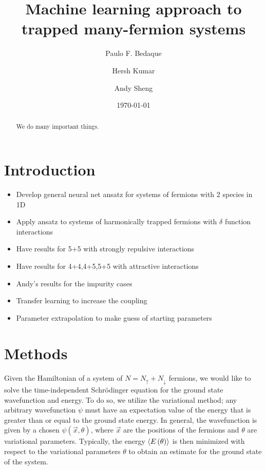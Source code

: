 \documentclass
[amsmath,10pt,aps,preprintnumbers,onecolumn,groupedaddress,superscriptaddress,notitlepage,nofootinbib,prd]{revtex4-1}
\begin{document}
\title{Machine learning approach to trapped many-fermion systems}


\author{Paulo F. Bedaque}
\author{Hersh Kumar}
\author{Andy Sheng}

\date{\today}

\begin{abstract}
We do many important things.

\end{abstract}

\maketitle

\section{Introduction}
\begin{itemize}
    \item Develop general neural net ansatz for systems of fermions with 2 species in 1D
    \item Apply ansatz to systems of harmonically trapped fermions with $\delta$ function interactions
    \item Have results for 5+5 with strongly repulsive interactions
    \item Have results for 4+4,4+5,5+5 with attractive interactions
    \item Andy's results for the impurity cases
    \item Transfer learning to increase the coupling 
    \item Parameter extrapolation to make guess of starting parameters
\end{itemize}

\section{Methods}
Given the Hamiltonian of a system of $N = N_\uparrow + N_\downarrow$ fermions, we would like to solve the time-independent Schr\"{o}dinger equation for the ground state
wavefunction and energy. To do so, we utilize the variational method; any arbitrary wavefunction $\psi$ must have an expectation value of the energy that is greater than
or equal to the ground state energy. In general, the wavefunction is given by a chosen $\psi\left(\vec{x}, \theta\right)$, where $\vec{x}$ are the positions of the fermions and $\theta$ are variational parameters.
Typically, the energy  $\braket{E\left(\theta\right)}$ is then minimized with respect to the variational parameters $\theta$ to obtain an estimate for the ground state of the system.
\end{document}
